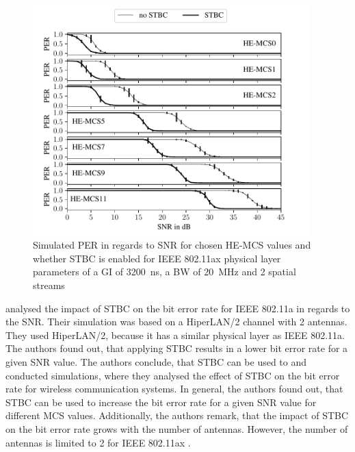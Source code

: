 \begin{figure}%
	\centering
	\includegraphics[width=0.95\textwidth]{figures/STBC_PER_to_SNR.pdf}
	\caption{Simulated \ac{PER} in regards to \ac{SNR} for chosen HE-\ac{MCS} values and whether \ac{STBC} is enabled for IEEE 802.11ax physical layer parameters of a \ac{GI} of \SI{3200}{\nano\second}, a \ac{BW} of \SI{20}{\mega\hertz} and 2 spatial streams}%
	\label{fig:PER_SNR_STBC}%
\end{figure}
\textcite{stamoulis_impact_2003} analysed the impact of \ac{STBC} on the bit error rate for IEEE 802.11a in regards to the \ac{SNR}. Their simulation was based
on a HiperLAN/2 channel with \num{2} antennas. They used HiperLAN/2, because it has a similar physical layer as IEEE 802.11a.
The authors found out, that applying \ac{STBC} results in a lower bit error rate for a given \ac{SNR} value. The authors conclude, that \ac{STBC} can be used to
\textcite{santumon_space-time_2012} and \textcite{tarokh_space-time_1999} conducted simulations, where they analysed the effect of \ac{STBC} on the bit error rate for
wireless communication systems. In general, the authors found out, that \ac{STBC} can be used to increase the bit error rate for a given \ac{SNR} value for different
\ac{MCS} values. Additionally, the authors remark, that the impact of \ac{STBC} on the bit error rate grows with the number of antennas.
However, the number of antennas is limited to \num{2} for IEEE 802.11ax \cite{noauthor_ieee_2021}.